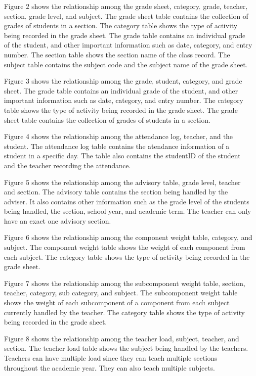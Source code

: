\documentclass[11pt,a4paper,titlepage]{article}
\begin{document}
Figure 2 shows the relationship among the grade sheet, category, grade, teacher, section, grade level, and subject. The grade sheet table contains the collection of grades of students in a section. The category table shows the type of activity being recorded in the grade sheet. The grade table contains an individual grade of the student, and other important information such as date, category, and entry number. The section table shows the section name of the class record. The subject table contains the subject code and the subject name of the grade sheet.

Figure 3 shows the relationship among the grade, student, category, and grade sheet. The grade table contains an individual grade of the student, and other important information such as date, category, and entry number. The category table shows the type of activity being recorded in the grade sheet. The grade sheet table contains the collection of grades of students in a section.

Figure 4 shows the relationship among the attendance log, teacher, and the student. The attendance log table contains the atendance information of a student in a specific day. The table also contains the studentID of the student and the teacher recording the attendance. 

Figure 5 shows the relationship among the advisory table, grade level, teacher and section. The advisory table contains the section being handled by the adviser. It also contains other information such as the grade level of the students being handled, the section, school year, and academic term. The teacher can only have an exact one advisory section. 

Figure 6 shows the relationship among the component weight table, category, and subject. The component weight table shows the weight of each component from each subject. The category table shows the type of activity being recorded in the grade sheet. 

Figure 7 shows the relationship among the subcomponent weight table, section, teacher, category, sub category, and subject. The subcomponent weight table shows the weight of each subcomponent of a component from each subject currently handled by the teacher. The category table shows the type of activity being recorded in the grade sheet. 

Figure 8 shows the relationship among the teacher load, subject, teacher, and section. The teacher load table shows the subject being handled by the teachers. Teachers can have multiple load since they can teach multiple sections throughout the academic year. They can also teach multiple subjects.
\end{document}
